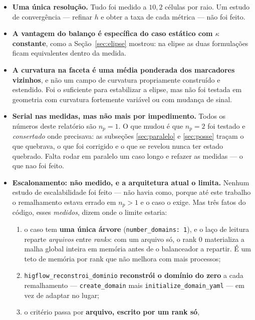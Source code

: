 \begin{itemize}
  \item \textbf{Uma \'unica resolu\c{c}\~ao.} Tudo foi medido a $10{,}2$
    c\'elulas por raio. Um estudo de converg\^encia --- refinar $h$ e obter a
    taxa de cada m\'etrica --- n\~ao foi feito.
  \item \textbf{A vantagem do balan\c{c}o \'e espec\'ifica do caso est\'atico
    com $\kappa$ constante}, como a Se\c{c}\~ao~\ref{sec:elipse} mostrou: na
    elipse as duas formula\c{c}\~oes ficam equivalentes dentro da medida.
  \item \textbf{A curvatura na faceta \'e uma m\'edia ponderada dos marcadores
    vizinhos}, e n\~ao um campo de curvatura propriamente constru\'ido e
    estendido. Foi o suficiente para estabilizar a elipse, mas n\~ao foi testada
    em geometria com curvatura fortemente vari\'avel ou com mudan\c{c}a de
    sinal.
  \item \textbf{Serial nas medidas, mas n\~ao mais por impedimento.} Todos os
    n\'umeros deste relat\'orio s\~ao $n_p=1$. O que mudou \'e que $n_p=2$ foi
    testado e \emph{consertado} onde precisava: as subse\c{c}\~oes
    \ref{sec:paralelo} e \ref{sec:posse} tra\c{c}am o que quebrava, o que foi
    corrigido e o que se revelou nunca ter estado quebrado. Falta rodar em
    paralelo um caso longo e refazer as medidas --- o que nao foi feito.
  \item \textbf{Escalonamento: n\~ao medido, e a arquitetura atual o limita.}
    Nenhum estudo de escalabilidade foi feito --- n\~ao havia como, porque at\'e
    este trabalho o remalhamento estava errado em $n_p>1$ e o caso o exige. Mas
    tr\^es fatos do c\'odigo, esses \emph{medidos}, dizem onde o limite estaria:
    \begin{enumerate}
      \item o caso tem \textbf{uma \'unica \'arvore}
        (\texttt{number\_domains:\ 1}), e o la\c{c}o de leitura reparte
        \emph{arquivos} entre \emph{ranks}: com um arquivo s\'o, o rank 0
        materializa a malha global inteira em mem\'oria antes de o balanceador a
        repartir. \'E um teto de mem\'oria por rank que n\~ao melhora com mais
        processos;
      \item \texttt{higflow\_\allowbreak{}reconstroi\_\allowbreak{}dominio} \textbf{reconstr\'oi o dom\'inio
        do zero} a cada remalhamento --- \texttt{create\_domain} mais
        \texttt{initialize\_\allowbreak{}domain\_\allowbreak{}yaml} --- em vez de adaptar no lugar;
      \item o crit\'erio passa por \textbf{arquivo, escrito por um rank s\'o},

\end{enumerate}
\end{itemize}
